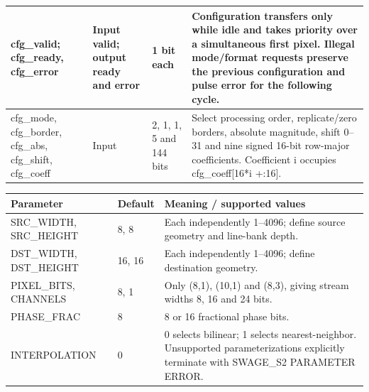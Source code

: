 \documentclass[11pt,a4paper]{article}
\begin{document}
{\begin{longtable}{@{}L{0.21\textwidth}|L{0.12\textwidth}|L{0.12\textwidth}|L{0.45\textwidth}@{}}
cfg\_\allowbreak{}valid; cfg\_\allowbreak{}ready,\allowbreak{} cfg\_\allowbreak{}error & Input valid; output ready and error & 1 bit each & Configuration transfers only while idle and takes priority over a simultaneous first pixel. Illegal mode/\allowbreak{}format requests preserve the previous configuration and pulse error for the following cycle.\\[2pt]\hline

cfg\_\allowbreak{}mode,\allowbreak{} cfg\_\allowbreak{}border,\allowbreak{} cfg\_\allowbreak{}abs,\allowbreak{} cfg\_\allowbreak{}shift,\allowbreak{} cfg\_\allowbreak{}coeff & Input & 2,\allowbreak{} 1,\allowbreak{} 1,\allowbreak{} 5 and 144 bits & Select processing order,\allowbreak{} replicate/\allowbreak{}zero borders,\allowbreak{} absolute magnitude,\allowbreak{} shift 0–31 and nine signed 16-bit row-major coefficients. Coefficient i occupies cfg\_\allowbreak{}coeff[\allowbreak{}16*\allowbreak{}i +\allowbreak{}:16]\allowbreak{}.\\[2pt]\hline

\bottomrule\end{longtable}}

{\small\renewcommand{\arraystretch}{1.18}\begin{longtable}{@{}L{0.22\textwidth}|L{0.21\textwidth}|L{0.49\textwidth}@{}}\toprule

\textbf{Parameter} & \textbf{Default} & \textbf{Meaning /\allowbreak{} supported values}\\\midrule\endhead

SRC\_\allowbreak{}WIDTH,\allowbreak{} SRC\_\allowbreak{}HEIGHT & 8,\allowbreak{} 8 & Each independently 1–4096; define source geometry and line-bank depth.\\[2pt]\hline

DST\_\allowbreak{}WIDTH,\allowbreak{} DST\_\allowbreak{}HEIGHT & 16,\allowbreak{} 16 & Each independently 1–4096; define destination geometry.\\[2pt]\hline

PIXEL\_\allowbreak{}BITS,\allowbreak{} CHANNELS & 8,\allowbreak{} 1 & Only (\allowbreak{}8,\allowbreak{}1)\allowbreak{},\allowbreak{} (\allowbreak{}10,\allowbreak{}1)\allowbreak{} and (\allowbreak{}8,\allowbreak{}3)\allowbreak{},\allowbreak{} giving stream widths 8,\allowbreak{} 16 and 24 bits.\\[2pt]\hline

PHASE\_\allowbreak{}FRAC & 8 & 8 or 16 fractional phase bits.\\[2pt]\hline

INTERPOLATION & 0 & 0 selects bilinear; 1 selects nearest-neighbor. Unsupported paramete\allowbreak{}rization\allowbreak{}s explicitly terminate with SWAGE\_\allowbreak{}S2 PARAMETER ERROR.\\[2pt]\hline

\bottomrule\end{longtable}}
\end{document}
